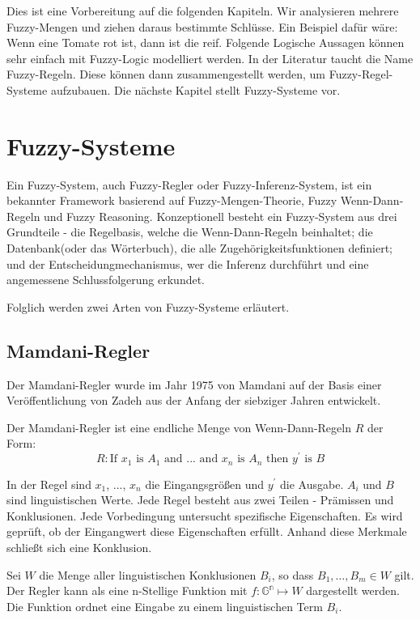 Dies ist eine Vorbereitung auf die folgenden Kapiteln. Wir analysieren mehrere Fuzzy-Mengen und ziehen daraus bestimmte Schlüsse. Ein Beispiel dafür wäre: Wenn eine Tomate rot ist, dann ist die reif. Folgende Logische Aussagen können sehr einfach mit Fuzzy-Logic modelliert werden. In der Literatur taucht die Name Fuzzy-Regeln. Diese können dann zusammengestellt werden, um Fuzzy-Regel-Systeme aufzubauen. Die nächste Kapitel stellt Fuzzy-Systeme vor. 

\section{Fuzzy-Systeme}

Ein Fuzzy-System, auch Fuzzy-Regler oder Fuzzy-Inferenz-System, ist ein bekannter Framework basierend auf Fuzzy-Mengen-Theorie, Fuzzy Wenn-Dann-Regeln und Fuzzy Reasoning. Konzeptionell besteht ein Fuzzy-System aus drei Grundteile - die Regelbasis, welche die Wenn-Dann-Regeln beinhaltet; die Datenbank(oder das Wörterbuch), die alle Zugehörigkeitsfunktionen definiert; und der Entscheidungmechanismus, wer die Inferenz durchführt und eine angemessene Schlussfolgerung erkundet.   

Folglich werden zwei Arten von Fuzzy-Systeme erläutert.

\subsection{Mamdani-Regler}

Der Mamdani-Regler wurde im Jahr 1975 von Mamdani auf der Basis einer Veröffentlichung von Zadeh aus der Anfang der siebziger Jahren entwickelt. 

Der Mamdani-Regler ist eine endliche Menge von Wenn-Dann-Regeln $R$ der Form:
\begin{equation}
	R: \text{If } x_1 \text{ is } A_1 \text{ and ... and } x_n \text{ is } A_n
	\text{ then } y^\prime \text{ is } B
\end{equation}

In der Regel sind $x_1$, ..., $x_n$ die Eingangsgrößen und $y^\prime$ die Ausgabe. $A_i$ und $B$ sind  linguistischen Werte. Jede Regel besteht aus zwei Teilen - Prämissen und Konklusionen. Jede Vorbedingung untersucht spezifische Eigenschaften. Es wird geprüft, ob der Eingangwert diese Eigenschaften erfüllt. Anhand diese Merkmale schließt sich eine Konklusion. 

Sei $W$ die Menge aller linguistischen Konklusionen $B_i$, so dass $B_1, \dots, B_m \in W$ gilt. Der Regler kann als eine n-Stellige Funktion mit $f: \mathbb{G^n} \mapsto W$ dargestellt werden. Die Funktion ordnet eine Eingabe zu einem linguistischen Term $B_i$.

